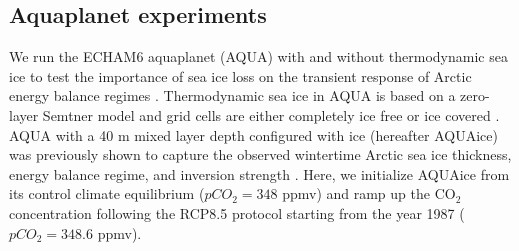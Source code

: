 \documentclass[draft]{agujournal2019}
\begin{document}
\subsection{Aquaplanet experiments}
We run the ECHAM6 aquaplanet (AQUA) with and without thermodynamic sea ice to test the importance of sea ice loss on the transient response of Arctic energy balance regimes \cite{stevens2013, shaw2020, shaw2022}. Thermodynamic sea ice in AQUA is based on a zero-layer Semtner model \cite{semtner1976} and grid cells are either completely ice free or ice covered \cite{giorgetta2013,salameh2018}. AQUA with a 40 m mixed layer depth configured with ice (hereafter AQUAice) was previously shown to capture the observed wintertime Arctic sea ice thickness, energy balance regime, and inversion strength \cite{miyawaki2022}. Here, we initialize AQUAice from its control climate equilibrium ($pCO_2=348$ ppmv) and ramp up the CO$_2$ concentration following the RCP8.5 protocol starting from the year 1987 ($pCO_2=348.6$ ppmv).
\end{document}
